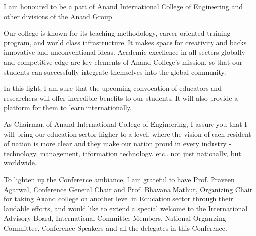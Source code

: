 \documentclass[twoside,11pt]{amsart}
\begin{document}
I am honoured to be a part of Anand International College of Engineering and other divisions of the Anand Group.

Our college is known for its teaching methodology, career-oriented training program, and world class infrastructure. It makes space for creativity and backs innovative and unconventional ideas. Academic excellence in all sectors globally and competitive edge are key elements of Anand College's mission, so that our students can successfully integrate themselves into the global community.

In this light, I am sure that the upcoming convocation of educators and researchers will offer incredible benefits to our students. It will also provide a platform for them to learn internationally.

As Chairman of Anand International College of Engineering, I assure you that I will bring our education sector higher to a level, where the vision of each resident of nation is more clear and they make our nation proud in every industry - technology, management, information technology, etc., not just nationally, but worldwide.

To lighten up the Conference ambiance, I am grateful to have Prof. Praveen Agarwal, Conference General Chair and Prof. Bhavana Mathur, Organizing Chair for taking Anand college on another level in Education sector through their laudable efforts, and would like to extend a special welcome to the International Advisory Board, International Committee Members, National Organizing Committee, Conference Speakers and all the delegates in this Conference.
\end{document}
